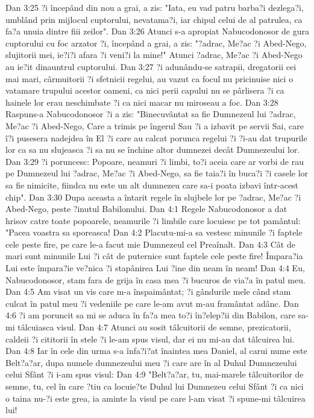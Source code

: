 Dan 3:25  ?i începând din nou a grai, a zis: "Iata, eu vad patru barba?i dezlega?i, umblând prin mijlocul cuptorului, nevatama?i, iar chipul celui de al patrulea, ca fa?a unuia dintre fiii zeilor".
Dan 3:26  Atunci s-a apropiat Nabucodonosor de gura cuptorului cu foc arzator ?i, începând a grai, a zis: "?adrac, Me?ac ?i Abed-Nego, slujitorii mei, ie?i?i afara ?i veni?i la mine!" Atunci ?adrac, Me?ac ?i Abed-Nego au ie?it dinauntrul cuptorului.
Dan 3:27  ?i adunându-se satrapii, dregatorii cei mai mari, cârmuitorii ?i sfetnicii regelui, au vazut ca focul nu pricinuise nici o vatamare trupului acestor oameni, ca nici perii capului nu se pârlisera ?i ca hainele lor erau neschimbate ?i ca nici macar nu miroseau a foc.
Dan 3:28  Raspuns-a Nabucodonosor ?i a zis: "Binecuvântat sa fie Dumnezeul lui ?adrac, Me?ac ?i Abed-Nego, Care a trimis pe îngerul Sau ?i a izbavit pe servii Sai, care î?i pusesera nadejdea în El ?i care au calcat porunca regelui ?i ?i-au dat trupurile lor ca sa nu slujeasca ?i sa nu se închine altor dumnezei decât Dumnezeului lor.
Dan 3:29  ?i poruncesc: Popoare, neamuri ?i limbi, to?i aceia care ar vorbi de rau pe Dumnezeul lui ?adrac, Me?ac ?i Abed-Nego, sa fie taia?i în buca?i ?i casele lor sa fie nimicite, fiindca nu este un alt dumnezeu care sa-i poata izbavi într-acest chip".
Dan 3:30  Dupa aceasta a întarit regele în slujbele lor pe ?adrac, Me?ac ?i Abed-Nego, peste ?inutul Babilonului.
Dan 4:1  Regele Nabucodonosor a dat hrisov catre toate popoarele, neamurile ?i limbile care locuiesc pe tot pamântul: "Pacea voastra sa sporeasca!
Dan 4:2  Placutu-mi-a sa vestesc minunile ?i faptele cele peste fire, pe care le-a facut mie Dumnezeul cel Preaînalt.
Dan 4:3  Cât de mari sunt minunile Lui ?i cât de puternice sunt faptele cele peste fire! Împara?ia Lui este împara?ie ve?nica ?i stapânirea Lui ?ine din neam în neam!
Dan 4:4  Eu, Nabucodonosor, stam fara de grija în casa mea ?i bucuros de via?a în patul meu.
Dan 4:5  Am visat un vis care m-a înspaimântat; ?i gândurile mele când stam culcat în patul meu ?i vedeniile pe care le-am avut m-au framântat adânc.
Dan 4:6  ?i am poruncit sa mi se aduca în fa?a mea to?i în?elep?ii din Babilon, care sa-mi tâlcuiasca visul.
Dan 4:7  Atunci au sosit tâlcuitorii de semne, prezicatorii, caldeii ?i cititorii în stele ?i le-am spus visul, dar ei nu mi-au dat tâlcuirea lui.
Dan 4:8  Iar în cele din urma s-a înfa?i?at înaintea mea Daniel, al carui nume este Belt?a?ar, dupa numele dumnezeului meu ?i care are în al Duhul Dumnezeului celui Sfânt ?i i-am spus visul:
Dan 4:9  "Belt?a?ar, tu, mai-marele tâlcuitorilor de semne, tu, cel în care ?tiu ca locuie?te Duhul lui Dumnezeu celui Sfânt ?i ca nici o taina nu-?i este grea, ia aminte la visul pe care l-am visat ?i spune-mi tâlcuirea lui!
